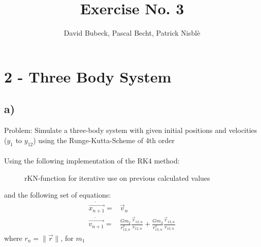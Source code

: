 \documentclass[11pt, a4paper, reqno]{scrartcl}
\begin{document}
    \title{Exercise No. 3}
    \author{David Bubeck, Pascal Becht, Patrick Nisbl\`e}
    \maketitle


    \section{2 - Three Body System}
    \subsection{a)}
    
        Problem: Simulate a three-body system with given initial positions and velocities ($y_1$ to $y_{12}$) using the Runge-Kutta-Scheme of 4th order\\\\        
        Using the following implementation of the RK4 method:
        \begin{figure}[H]
            
            \caption{rKN-function for iterative use on previous calculated values}
        \end{figure}
        and the following set of equations:
        \begin{align}
            \dot {\overrightarrow{x_{n+1}}} =& \vec v_{n}\\
            \dot {\overrightarrow{v_{n+1}}} =& \frac{G m_2}{r_{12,n}^2}\frac{\vec r_{12,n}}{r_{12,n}} + \frac{G m_3}{r_{13,n}^2}\frac{\vec r_{13,n}}{r_{13,n}}
        \end{align}
        where $r_n = \| \vec r\|$, for $m_1$
        
\end{document}
